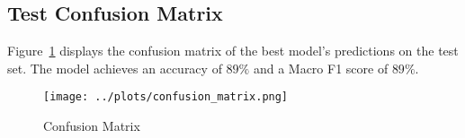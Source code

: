 \documentclass[10pt,conference,compsocconf]{IEEEtran}
\begin{document}
\subsection{Test Confusion Matrix}

Figure~\ref{fig:confusion_matrix} displays the confusion matrix of the best
model's predictions on the test set. The model achieves an accuracy of $89\%$ and
a Macro F1 score of $89\%$.

\begin{figure}[!ht]
  \centering
  \texttt{[image: ../plots/confusion\_matrix.png]}
  \caption{Confusion Matrix}
  \label{fig:confusion_matrix}
\end{figure}
\end{document}
